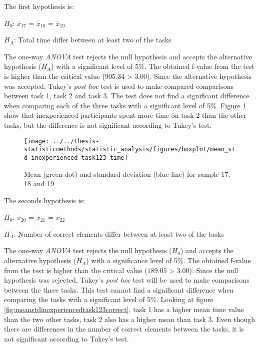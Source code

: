 The first hypothesis is:\\
\centerline{$H_{0}$: $\overline{x}_{17}$ = $\overline{x}_{18}$ = $\overline{x}_{19}$}
\centerline{$H_{A}$: Total time differ between at least two of the tasks}
\vspace{0.2cm}

The one-way \textit{ANOVA} test rejects the null hypothesis and accepts the alternative hypothesis ($H_{A}$) with a significant level of 5\%. The obtained f-value from the test is higher than the critical value ($905.34$ > $3.00$). Since the alternative hypothesis was accepted, Tukey's \textit{post hoc} test is used to make compared comparisons between task 1, task 2 and task 3. The test does not find a significant difference when comparing each of the three tasks with a significant level of 5\%. Figure \ref{fig:meanstdinexperiencedtask123time} show that inexperienced participants spent more time on task 2 than the other tasks, but the difference is not significant according to Tukey's test.

\begin{figure}[H]
	\centering
	\texttt{[image: ../../thesis-statisticmethods/statistic\_analysis/figures/boxplot/mean\_std\_inexperienced\_task123\_time]}
	\caption{Mean (green dot) and standard deviation (blue line) for sample 17, 18 and 19}
	\label{fig:meanstdinexperiencedtask123time}
\end{figure}

The seconds hypothesis is:\\
\centerline{$H_{0}$: $\overline{x}_{20}$ = $\overline{x}_{21}$ = $\overline{x}_{22}$}
\centerline{$H_{A}$: Number of correct elements differ between at least two of the tasks}
\vspace{0.2cm}

The one-way \textit{ANOVA} test rejects the null hypothesis ($H_0$) and accepts the alternative hypothesis ($H_{A}$) with a significance level of 5\%. The obtained f-value from the test is higher than the critical value ($189.05$ > $3.00$). Since the null hypothesis was rejected, Tukey's \textit{post hoc} test will be used to make comparisons between the three tasks. This test cannot find a significant difference when comparing the tasks with a significant level of 5\%. Looking at figure \ref{fig:meanstdinexperiencedtask123correct}, task 1 has a higher mean time value than the two other tasks, task 2 also has a higher mean than task 3. Even though there are differences in the number of correct elements between the tasks, it is not significant according to Tukey's test. 

